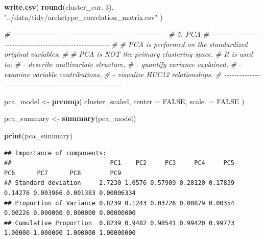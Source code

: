 \documentclass[
]{article}
\newenvironment{Shaded}{\begin{snugshade}}{\end{snugshade}}
\newcommand{\AttributeTok}[1]{\textcolor[rgb]{0.13,0.29,0.53}{#1}}
\newcommand{\CommentTok}[1]{\textcolor[rgb]{0.56,0.35,0.01}{\textit{#1}}}
\newcommand{\ConstantTok}[1]{\textcolor[rgb]{0.56,0.35,0.01}{#1}}
\newcommand{\DecValTok}[1]{\textcolor[rgb]{0.00,0.00,0.81}{#1}}
\newcommand{\FunctionTok}[1]{\textcolor[rgb]{0.13,0.29,0.53}{\textbf{#1}}}
\newcommand{\NormalTok}[1]{#1}
\newcommand{\OtherTok}[1]{\textcolor[rgb]{0.56,0.35,0.01}{#1}}
\newcommand{\StringTok}[1]{\textcolor[rgb]{0.31,0.60,0.02}{#1}}
\begin{document}
\begin{Shaded}
\begin{Highlighting}[]
\FunctionTok{write.csv}\NormalTok{(}
  \FunctionTok{round}\NormalTok{(cluster\_cor, }\DecValTok{3}\NormalTok{),}
  \StringTok{"../data/tidy/archetype\_correlation\_matrix.csv"}
\NormalTok{)}


\CommentTok{\# {-}{-}{-}{-}{-}{-}{-}{-}{-}{-}{-}{-}{-}{-}{-}{-}{-}{-}{-}{-}{-}{-}{-}{-}{-}{-}{-}{-}{-}{-}{-}{-}{-}{-}{-}{-}{-}{-}{-}{-}{-}{-}{-}{-}{-}{-}{-}{-}{-}{-}{-}{-}{-}{-}{-}{-}{-}{-}{-}{-}}
\CommentTok{\# 5. PCA}
\CommentTok{\# {-}{-}{-}{-}{-}{-}{-}{-}{-}{-}{-}{-}{-}{-}{-}{-}{-}{-}{-}{-}{-}{-}{-}{-}{-}{-}{-}{-}{-}{-}{-}{-}{-}{-}{-}{-}{-}{-}{-}{-}{-}{-}{-}{-}{-}{-}{-}{-}{-}{-}{-}{-}{-}{-}{-}{-}{-}{-}{-}{-}}
\CommentTok{\#}
\CommentTok{\# PCA is performed on the standardized original variables.}
\CommentTok{\#}
\CommentTok{\# PCA is NOT the primary clustering space.}
\CommentTok{\# It is used to:}
\CommentTok{\#   {-} describe multivariate structure,}
\CommentTok{\#   {-} quantify variance explained,}
\CommentTok{\#   {-} examine variable contributions,}
\CommentTok{\#   {-} visualize HUC12 relationships.}
\CommentTok{\# {-}{-}{-}{-}{-}{-}{-}{-}{-}{-}{-}{-}{-}{-}{-}{-}{-}{-}{-}{-}{-}{-}{-}{-}{-}{-}{-}{-}{-}{-}{-}{-}{-}{-}{-}{-}{-}{-}{-}{-}{-}{-}{-}{-}{-}{-}{-}{-}{-}{-}{-}{-}{-}{-}{-}{-}{-}{-}{-}{-}}

\NormalTok{pca\_model }\OtherTok{\textless{}{-}} \FunctionTok{prcomp}\NormalTok{(}
\NormalTok{  cluster\_scaled,}
  \AttributeTok{center =} \ConstantTok{FALSE}\NormalTok{,}
  \AttributeTok{scale. =} \ConstantTok{FALSE}
\NormalTok{)}

\NormalTok{pca\_summary }\OtherTok{\textless{}{-}} \FunctionTok{summary}\NormalTok{(pca\_model)}

\FunctionTok{print}\NormalTok{(pca\_summary)}
\end{Highlighting}
\end{Shaded}

\begin{verbatim}
## Importance of components:
##                           PC1    PC2     PC3     PC4     PC5     PC6      PC7      PC8        PC9
## Standard deviation     2.7230 1.0576 0.57909 0.28120 0.17839 0.14276 0.003966 0.001383 0.00006334
## Proportion of Variance 0.8239 0.1243 0.03726 0.00879 0.00354 0.00226 0.000000 0.000000 0.00000000
## Cumulative Proportion  0.8239 0.9482 0.98541 0.99420 0.99773 1.00000 1.000000 1.000000 1.00000000
\end{verbatim}
\end{document}
